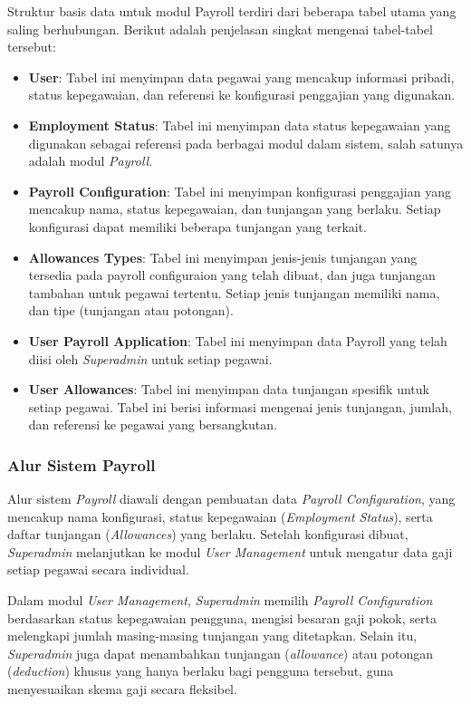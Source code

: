 Struktur basis data untuk modul Payroll terdiri dari beberapa tabel utama yang saling berhubungan. Berikut adalah penjelasan singkat mengenai tabel-tabel tersebut:
\begin{itemize}
    \item \textbf{User}: Tabel ini menyimpan data pegawai yang mencakup informasi pribadi, status kepegawaian, dan referensi ke konfigurasi penggajian yang digunakan.
    \item \textbf{Employment Status}: Tabel ini menyimpan data status kepegawaian yang digunakan sebagai referensi pada berbagai modul dalam sistem, salah satunya adalah modul \textit{Payroll}.
    \item \textbf{Payroll Configuration}: Tabel ini menyimpan konfigurasi penggajian yang mencakup nama, status kepegawaian, dan tunjangan yang berlaku. Setiap konfigurasi dapat memiliki beberapa tunjangan yang terkait.
    \item \textbf{Allowances Types}: Tabel ini menyimpan jenis-jenis tunjangan yang tersedia pada payroll configuraion yang telah dibuat, dan juga tunjangan tambahan untuk pegawai tertentu. Setiap jenis tunjangan memiliki nama, dan tipe (tunjangan atau potongan).
    \item \textbf{User Payroll Application}: Tabel ini menyimpan data Payroll yang telah diisi oleh \textit{Superadmin} untuk setiap pegawai.
    \item \textbf{User Allowances}: Tabel ini menyimpan data tunjangan spesifik untuk setiap pegawai. Tabel ini berisi informasi mengenai jenis tunjangan, jumlah, dan referensi ke pegawai yang bersangkutan.
\end{itemize}

\subsubsection{Alur Sistem Payroll}
Alur sistem \textit{Payroll} diawali dengan pembuatan data \textit{Payroll Configuration}, yang mencakup nama konfigurasi, status kepegawaian (\textit{Employment Status}), serta daftar tunjangan (\textit{Allowances}) yang berlaku. Setelah konfigurasi dibuat, \textit{Superadmin} melanjutkan ke modul \textit{User Management} untuk mengatur data gaji setiap pegawai secara individual.

Dalam modul \textit{User Management}, \textit{Superadmin} memilih \textit{Payroll Configuration} berdasarkan status kepegawaian pengguna, mengisi besaran gaji pokok, serta melengkapi jumlah masing-masing tunjangan yang ditetapkan. Selain itu, \textit{Superadmin} juga dapat menambahkan tunjangan (\textit{allowance}) atau potongan (\textit{deduction}) khusus yang hanya berlaku bagi pengguna tersebut, guna menyesuaikan skema gaji secara fleksibel.

